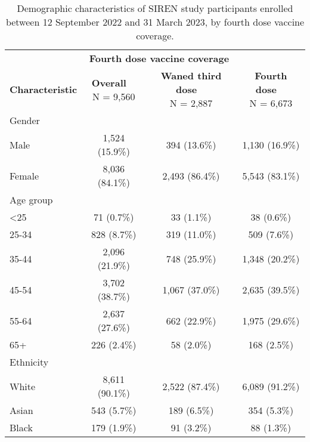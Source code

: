 
\begin{longtable}[t]{>{\raggedright\arraybackslash}p{6cm}ccc}
\caption{\label{tab:siren_vaccine_uptake}Demographic characteristics of SIREN study participants enrolled between 12 September 2022 and 31 March 2023, by fourth dose vaccine coverage.}\\
\toprule
\multicolumn{2}{c}{ } & \multicolumn{2}{c}{\textbf{Fourth dose vaccine coverage}} \\
\cmidrule(l{3pt}r{3pt}){3-4}
\textbf{Characteristic} & \makecell[c]{\textbf{Overall}\ \ \\N = 9,560} & \makecell[c]{\textbf{Waned third dose}\ \ \\N = 2,887} & \makecell[c]{\textbf{Fourth dose}\ \ \\N = 6,673}\\
\midrule
Gender &  &  & \\
\hspace{1em}Male & 1,524 (15.9\%) & 394 (13.6\%) & 1,130 (16.9\%)\\
\hspace{1em}Female & 8,036 (84.1\%) & 2,493 (86.4\%) & 5,543 (83.1\%)\\
Age group &  &  & \\
\hspace{1em}<25 & 71 (0.7\%) & 33 (1.1\%) & 38 (0.6\%)\\
\hspace{1em}25-34 & 828 (8.7\%) & 319 (11.0\%) & 509 (7.6\%)\\
\hspace{1em}35-44 & 2,096 (21.9\%) & 748 (25.9\%) & 1,348 (20.2\%)\\
\hspace{1em}45-54 & 3,702 (38.7\%) & 1,067 (37.0\%) & 2,635 (39.5\%)\\
\hspace{1em}55-64 & 2,637 (27.6\%) & 662 (22.9\%) & 1,975 (29.6\%)\\
\hspace{1em}65+ & 226 (2.4\%) & 58 (2.0\%) & 168 (2.5\%)\\
Ethnicity &  &  & \\
\hspace{1em}White & 8,611 (90.1\%) & 2,522 (87.4\%) & 6,089 (91.2\%)\\
\hspace{1em}Asian & 543 (5.7\%) & 189 (6.5\%) & 354 (5.3\%)\\
\hspace{1em}Black & 179 (1.9\%) & 91 (3.2\%) & 88 (1.3\%)\\

\end{longtable}
